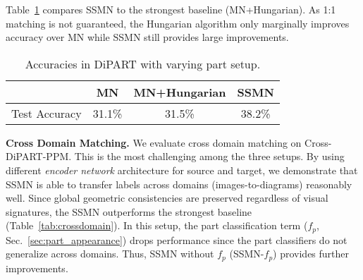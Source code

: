 \documentclass[10pt,twocolumn,letterpaper]{article}
\begin{document}
Table~\ref{tab:varypart} compares SSMN to the strongest baseline (MN+Hungarian). As 1:1 matching is not guaranteed, the Hungarian algorithm only marginally improves accuracy over MN while SSMN still provides large improvements.
\vspace{-.5em}\begin{table}[h]
    \centering
    \begin{tabular}{cccc}
        \toprule
                        & MN        & MN+Hungarian  & SSMN       \\
        \hline
        Test Accuracy   & 31.1\%    & 31.5\%        & 38.2\% \\
        \bottomrule
    \end{tabular}
    \caption{Accuracies in DiPART with varying part setup.}
    \vspace{-0.5em}
    \label{tab:varypart}
\end{table}\noindent\textbf{Cross Domain Matching.}
We evaluate cross domain matching on Cross-DiPART-PPM. This is the most challenging among the three setups. By using different \emph{encoder network} architecture for source and target, we demonstrate that SSMN is able to transfer labels across domains (images-to-diagrams) reasonably well. Since global geometric consistencies are preserved regardless of visual signatures, the SSMN outperforms the strongest baseline (Table~\ref{tab:crossdomain}). In this setup, the part classification term ($f_p$, Sec.~\ref{sec:part_appearance}) drops performance since the part classifiers do not generalize across domains. Thus, SSMN without $f_p$ (SSMN-$f_p$) provides further improvements.
\vspace{-0.5em}\begin{table}[h]
    \centering
    \caption{Cross domain accuracies (Cross-DiPART-PPM data)}
    \vspace{-0.5em}
    \label{tab:crossdomain}
\end{table}%
\vspace{-.5em}
\end{document}
